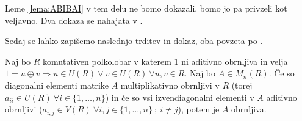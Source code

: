 \documentclass[mat1]{fmfdelo}
\begin{document}
Leme \ref{lema:ABIBAI} v tem delu ne bomo dokazali, bomo jo pa privzeli kot veljavno. Dva dokaza se nahajata v \cite{bib:Reutenauer}.

Sedaj se lahko zapišemo naslednjo trditev in dokaz, oba povzeta po \cite{bib:Tanbase}.

\begin{trditev}\label{trd:obrnljMatr}
	Naj bo $R$ komutativen polkolobar v katerem $1$ ni aditivno obrnljiva in velja $1 = u \oplus v \Rightarrow u\in U(R) \lor v\in U(R)~\forall u, v \in R$. Naj bo $A\in M_n(R)$. Če so diagonalni elementi matrike $A$ multiplikativno obrnljivi v $R$ (torej $a_{ii}\in U(R)~\forall i \in \{1, \ldots, n\}$) in če so vsi izvendiagonalni elementi v $A$ aditivno obrnljivi ($a_{i,j}\in V(R)~\forall i, j\in \{1, \ldots, n\} ~;~i\neq j$), potem je $A$ obrnljiva.
\end{trditev}
\end{document}
